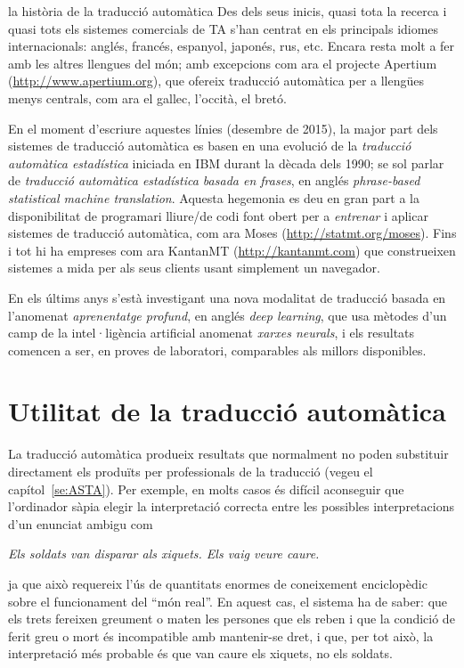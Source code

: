 \begin{persabermes}{la història de la traducció automàtica}
  Des dels seus inicis, quasi tota la recerca i quasi tots els
  sistemes comercials de TA s'han centrat en els principals idiomes
  internacionals: anglés, francés, espanyol, japonés, rus, etc.
  Encara resta molt a fer amb les altres llengues del món; amb
  excepcions com ara el projecte Apertium
  (\url{http://www.apertium.org}), que ofereix traducció automàtica
  per a llengües menys centrals, com ara el gallec, l'occità, el
  bretó.

  En el moment d'escriure aquestes línies (desembre de 2015), la major
  part dels sistemes de traducció automàtica es basen en una evolució
  de la \emph{traducció automàtica estadística} iniciada en IBM durant
  la dècada dels 1990; se sol parlar de \emph{traducció automàtica
    estadística basada en frases}, en anglés \emph{phrase-based
    statistical machine translation}. Aquesta hegemonia es deu en gran
  part a la disponibilitat de programari lliure/de codi font obert per
  a \emph{entrenar} i aplicar sistemes de traducció automàtica, com
  ara Moses (\url{http://statmt.org/moses}). Fins i tot hi ha empreses
  com ara KantanMT (\url{http://kantanmt.com}) que construeixen
  sistemes a mida per als seus clients usant simplement un navegador.

  En els últims anys s'està investigant una nova modalitat de
  traducció basada en l'anomenat \emph{aprenentatge profund}, en
  anglés \emph{deep learning}, que usa mètodes d'un camp de la
  intel·ligència artificial anomenat \emph{xarxes neurals}, i els
  resultats comencen a ser, en proves de laboratori, comparables als
  millors disponibles.

\end{persabermes}


\section{Utilitat de la traducció automàtica}
\label{ss:UTA}
La traducció automàtica produeix resultats que normalment no poden
substituir directament els produïts per professionals de la traducció
(vegeu el capítol~\ref{se:ASTA}).  Per exemple, en molts casos és
difícil aconseguir que l'ordinador sàpia elegir la interpretació
correcta entre les possibles interpretacions d'un enunciat ambigu com
\begin{center}
  \emph{Els soldats van disparar als xiquets. Els vaig veure caure.}
\end{center} 
ja que això requereix l'ús de quantitats enormes de coneixement
enciclopèdic sobre el funcionament del ``món real''. En aquest cas, el
sistema ha de saber: que els trets fereixen greument o maten les
persones que els reben i que la condició de ferit greu o mort és
incompatible amb mantenir-se dret, i que, per tot això, la
interpretació més probable és que van caure els xiquets, no els
soldats.  

